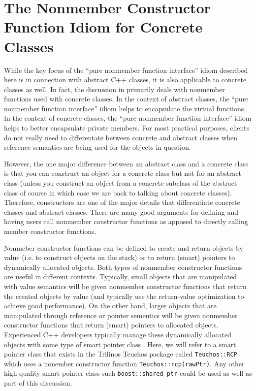 \documentclass[pdf,ps2pdf,11pt]{SANDreport}
\begin{document}
%
\section{The Nonmember Constructor Function Idiom for Concrete Classes}
%

While the key focus of the ``pure nonmember function interface'' idiom
described here is in connection with abstract C++ classes, it is also
applicable to concrete classes as well.  In fact, the discussion in
{}\cite[Item 23]{EffectiveC++3rd} primarily deals with nonmember functions
used with concrete classes.  In the context of abstract classes, the ``pure
nonmember function interface'' idiom helps to encapsulate the virtual
functions.  In the context of concrete classes, the ``pure nonmember function
interface'' idiom helps to better encapsulate private members.  For most
practical purposes, clients do not really need to differentate between
concrete and abstract classes when reference semantics are being used for the
objects in question.

However, the one major difference between an abstract class and a concrete
class is that you can construct an object for a concrete class but not for an
abstract class (unless you construct an object from a concrete subclass of the
abstract class of course in which case we are back to talking about concrete
classes).  Therefore, constructors are one of the major details that
differentiate concrete classes and abstract classes.  There are many good
arguments for defining and having users call nonmember constructor functions
as apposed to directly calling member constructor functions.

Nonmeber constructor functions can be defined to create and return objects by
value (i.e. to construct objects on the stack) or to return (smart) pointers
to dynamically allocated objects.  Both types of nonmember constructor
functions are useful in different contexts.  Typically, small objects that are
manipulated with value semantics will be given nonmember constructor functions
that return the created objects by value (and typically use the return-value
optimization to achieve good performance).  On the other hand, larger objects
that are manipulated through reference or pointer sementics will be given
nonmember constructor functions that return (smart) pointers to allocated
objects.  Experienced C++ developers typically manage these dynamically
allocated objects with some type of smart pointer class {}\cite[Item
13]{C++CodingStandards05}.  Here, we will refer to a smart pointer class that
exists in the Trilinos Teuchos package called {}\texttt{Teuchos\-::RCP}
{}\cite{RefCountPtrBeginnersGuide} which uses a nonember constructor function
{}\texttt{Teuchos\-::rcp(rawPtr)}.  Any other high quality smart pointer class
such {}\texttt{boost\-::shared\_ptr} could be used as well as part of this
discussion.
\end{document}
